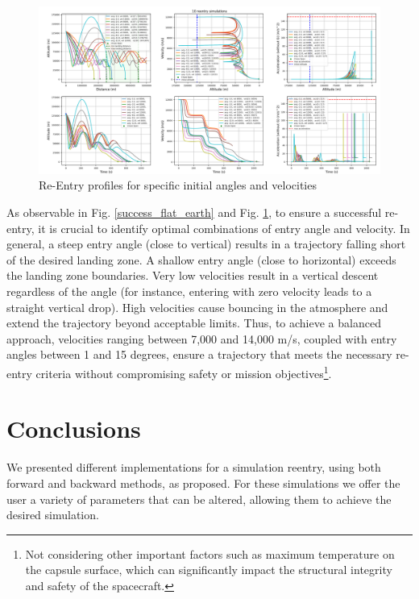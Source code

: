 \documentclass[runningheads]{llncs}
\begin{document}
\begin{figure}
\centering
\includegraphics[width=1\textwidth]{images/sim_results_sample.png}
\caption{Re-Entry profiles for specific initial angles and velocities} \label{sim_results_sample}
\end{figure}

As observable in Fig. \ref{success_flat_earth} and Fig. \ref{sim_results_sample}, to ensure a successful re-entry, it is crucial to identify optimal combinations of entry angle and velocity. In general, a steep entry angle (close to vertical) results in a trajectory falling short of the desired landing zone. A shallow entry angle (close to horizontal) exceeds the landing zone boundaries. Very low velocities result in a vertical descent regardless of the angle (for instance, entering with zero velocity leads to a straight vertical drop). High velocities cause bouncing in the atmosphere and extend the trajectory beyond acceptable limits.
Thus, to achieve a balanced approach, velocities ranging between 7,000 and 14,000 m/s, coupled with entry angles between 1 and 15 degrees, ensure a trajectory that meets the necessary re-entry criteria without compromising safety or mission objectives\footnote{Not considering other important factors such as maximum temperature on the capsule surface, which can significantly impact the structural integrity and safety of the spacecraft.}.







\section{Conclusions}
We presented different implementations for a simulation reentry, using both forward and backward methods, as proposed. For these simulations we offer the user a variety of parameters that can be altered, allowing them to achieve the desired simulation.
\end{document}
